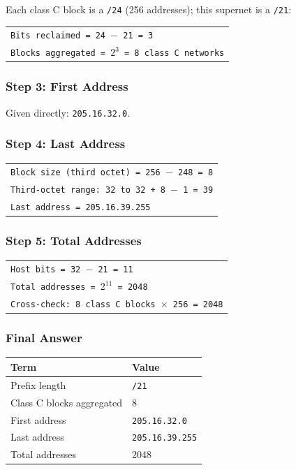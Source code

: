 \documentclass[11pt,a4paper]{article}
\begin{document}
Each class C block is a \texttt{/24} (256 addresses); this supernet is a
\texttt{/21}:

\begin{tabularx}{\textwidth}{@{}X@{}}
\texttt{Bits reclaimed = 24 $-$ 21 = 3} \\
\texttt{Blocks aggregated = $2^{3}$ = 8 class C networks} \\
\end{tabularx}

\subsubsection*{Step 3: First Address}

Given directly: \texttt{205.16.32.0}.

\subsubsection*{Step 4: Last Address}

\begin{tabularx}{\textwidth}{@{}X@{}}
\texttt{Block size (third octet) = 256 $-$ 248 = 8} \\
\texttt{Third-octet range: 32 to 32 + 8 $-$ 1 = 39} \\
\texttt{Last address = 205.16.39.255} \\
\end{tabularx}

\subsubsection*{Step 5: Total Addresses}

\begin{tabularx}{\textwidth}{@{}X@{}}
\texttt{Host bits = 32 $-$ 21 = 11} \\
\texttt{Total addresses = $2^{11}$ = 2048} \\
\texttt{Cross-check: 8 class C blocks $\times$ 256 = 2048} \\
\end{tabularx}

\subsubsection*{Final Answer}

\begin{tabularx}{\textwidth}{@{}lX@{}}
\toprule
\rowcolor{tablehead}\textbf{Term} & \textbf{Value} \\
\midrule
Prefix length & \texttt{/21} \\
Class C blocks aggregated & 8 \\
First address & \texttt{205.16.32.0} \\
Last address & \texttt{205.16.39.255} \\
Total addresses & 2048 \\
\bottomrule
\end{tabularx}
\end{document}
